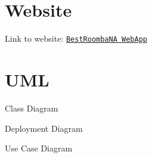 \hypertarget{Development_web}{}\section{Website}\label{Development_web}
Link to website\+: \href{../../../MQTTwebapp/mqtt.html}{\tt Best\+Roomba\+NA Web\+App}\hypertarget{Development_uml_sect}{}\section{U\+ML}\label{Development_uml_sect}
Class Diagram 

Deployment Diagram 

Use Case Diagram  